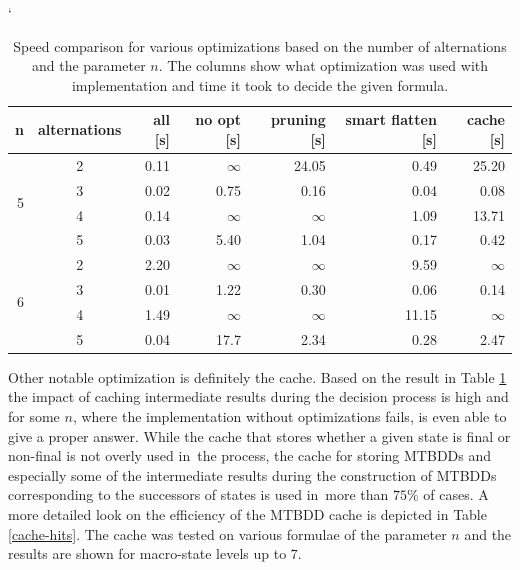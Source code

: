 \begin{table}[h!]
\catcode`
 \begin{center}
  \begin{tabular}{| r | c || r | r | r | r | r |}
  \hline
   \textbf{n} & \textbf{alternations} & \textbf{all [s]} & \textbf{no opt
   [s]} & \textbf{pruning [s]} & \textbf{smart flatten [s]} & \textbf{cache
   [s]}\\
   \hline
   \hline
    \multirow{4}{*}{5} & 2 & 0.11 & $\infty$ & 24.05 & 0.49 & 25.20\\
    \cline{2-7}
     & 3 & 0.02 & 0.75 & 0.16 & 0.04 & 0.08\\
    \cline{2-7}
     & 4 & 0.14 & $\infty$ & $\infty$ & 1.09 & 13.71\\
    \cline{2-7}
     & 5 & 0.03 & 5.40 & 1.04 & 0.17 & 0.42\\
    \hline
   \hline
   \multirow{4}{*}{6} & 2 & 2.20 & $\infty$ & $\infty$ & 9.59 & $\infty$\\
   \cline{2-7}
    & 3 & 0.01 & 1.22 & 0.30 & 0.06 & 0.14\\
    \cline{2-7}
    & 4 & 1.49 & $\infty$ & $\infty$ & 11.15 & $\infty$\\
    \cline{2-7}
    & 5 & 0.04 & 17.7 & 2.34 & 0.28 & 2.47\\
   \hline
  \end{tabular}
 \end{center}
 \caption{Speed comparison for various optimizations based on the number of
 alternations and the parameter $n$. The columns show what
 optimization was used with implementation and time it took to
 decide the given formula.}\label{opt-times}
\end{table}
\newpage
Other notable optimization is definitely the cache. Based on the result in
Table \ref{opt-times} the impact of caching intermediate results during the
decision process is high and for some $n$, where the implementation
without optimizations fails, is even able to give a proper answer. While
the cache that stores whether a given state is final or non-final is not overly
used in~the process, the cache for storing MTBDDs and especially some of the
intermediate results during the construction of MTBDDs corresponding to the
successors of states is used in~more than $75\%$ of cases. A more detailed
look on the efficiency of the MTBDD cache is depicted in Table \ref{cache-hits}.
The cache was tested on various formulae of the parameter $n$ and the results
are shown for macro-state levels up to $7$.

